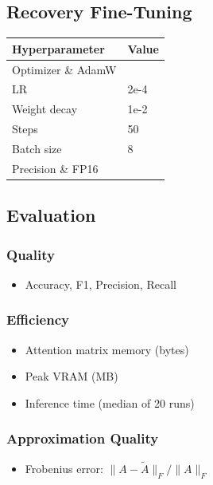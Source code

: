 \subsection{Recovery Fine-Tuning}

\begin{table}[H]
\centering
\small
\begin{tabular}{ll}
\toprule
\textbf{Hyperparameter} & \textbf{Value} \\
\midrule
Optimizer \& AdamW \\
LR & 2e-4 \\
Weight decay & 1e-2 \\
Steps & 50 \\
Batch size & 8 \\
Precision \& FP16 \\
\bottomrule
\end{tabular}
\end{table}

\subsection{Evaluation}

\subsubsection{Quality}
\begin{itemize}
\item Accuracy, F1, Precision, Recall

\end{itemize}
\subsubsection{Efficiency}
\begin{itemize}
\item Attention matrix memory (bytes)
\item Peak VRAM (MB)
\item Inference time (median of 20 runs)

\end{itemize}
\subsubsection{Approximation Quality}
\begin{itemize}
\item Frobenius error: $\|A - \tilde{A}\|_F / \|A\|_F$

\end{itemize}
